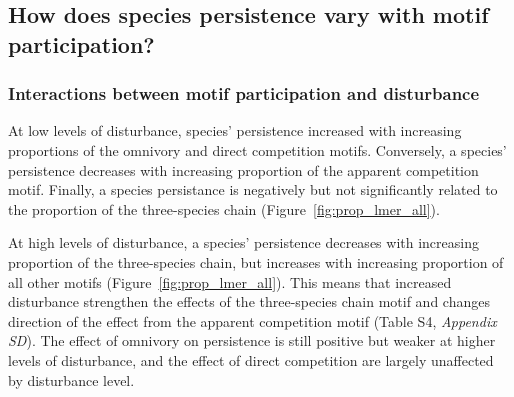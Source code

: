 \documentclass[12pt]{article}
\begin{document}
\begin{spacing}{2.0}
    
    \subsection*{How does species persistence vary with motif participation?} 
    
    
        \subsubsection*{Interactions between motif participation and disturbance}
        
            At low levels of disturbance, species' persistence increased with increasing proportions of the omnivory and direct competition motifs. Conversely, a species' persistence decreases with increasing proportion of the apparent competition motif. Finally, a species persistance is negatively but not significantly related to the proportion of the three-species chain (Figure~\ref{fig:prop_lmer_all}).
            
            
            At high levels of disturbance, a species' persistence decreases with increasing proportion of the three-species chain, but increases with increasing proportion of all other motifs (Figure~\ref{fig:prop_lmer_all}).
            This means that increased disturbance strengthen the effects of the three-species chain motif and changes direction of the effect from the apparent competition motif  (Table S4, \emph{Appendix SD}).
            The effect of omnivory on persistence is still positive but weaker at higher levels of disturbance, and the effect of direct competition are largely unaffected by disturbance level.
    

\end{spacing}
\end{document}
